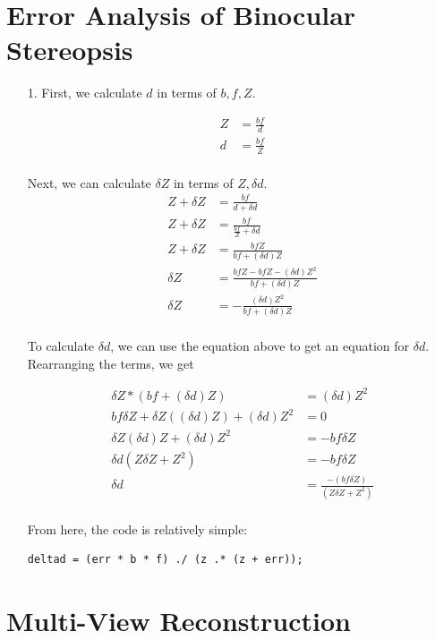 \documentclass[11pt]{article}
\begin{document}
\newpage
\section{Error Analysis of Binocular Stereopsis}
\begin{enumerate}
\item[1.]
First, we calculate $d$ in terms of $b, f, Z$.

\begin{align*}
Z &= \frac{bf}{d} \\
d &= \frac{bf}{Z} \\
\end{align*}

Next, we can calculate $\delta Z$ in terms of $Z, \delta d$.
\begin{align*}
Z + \delta Z &= \frac{bf}{d + \delta d} \\
Z + \delta Z &= \frac{bf}{\frac{bf}{Z} + \delta d} \\
Z + \delta Z &= \frac{bfZ}{bf + (\delta d) Z} \\
\delta Z &= \frac{bfZ - bfZ - (\delta d) Z^2}{bf + (\delta d) Z} \\
\delta Z &= -\frac{(\delta d) Z^2}{bf + (\delta d) Z} \\
\end{align*}

To calculate $\delta d$, we can use the equation above to get an equation for
$\delta d$. Rearranging the terms, we get

\begin{align*}
\delta Z * (bf + (\delta d) Z) &= (\delta d) Z^2 \\
bf \delta Z + \delta Z (( \delta d) Z) + (\delta d) Z^2 &= 0 \\
\delta Z (\delta d) Z + (\delta d) Z^2 &= - bf \delta Z  \\
\delta d (Z \delta Z + Z^2) &= - bf \delta Z \\
\delta d  &= \frac{- (bf \delta Z)}{(Z \delta Z + Z^2)} \\
\end{align*}

From here, the code is relatively simple:
\begin{verbatim}
deltad = (err * b * f) ./ (z .* (z + err));
\end{verbatim}

\end{enumerate}


\newpage
\section{Multi-View Reconstruction}
\end{document}
